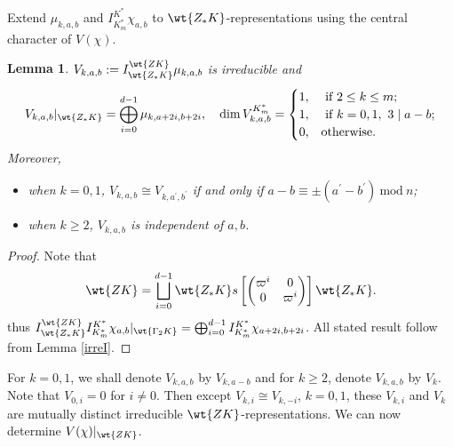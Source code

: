 \documentclass[11pt,reqno]{amsart}
\renewcommand{\mod}{\ \mathrm{mod}\ }\renewcommand{\Re}{{\mathrm{Re}}}
\theoremstyle{plain}
\newtheorem{lem}[thm]{Lemma}  \newtheorem{prop}[thm]{Proposition}
\theoremstyle{remark} \newtheorem{remark}[thm]{Remark}
\theoremstyle{definition} \newtheorem{exercise}[thm]{Exercise}
\theoremstyle{definition} \newtheorem{example}[thm]{Example} \newtheorem{condition}[thm]{Condition}
\numberwithin{equation}{section}
\renewcommand{\-}{\text{--}}
\begin{document}
  Extend $\mu_{k,a,b}$ and $I_{K_m^*}^{K^*}\chi_{a,b}$  to  $\wt{Z_*K}$-representations using  the central character of $V(\chi)$. 
\begin{lem}\label{irreIII}$V_{k,a,b}:=I_{\wt{Z_*K}}^{\wt{ZK}}\mu_{k,a,b}$ is irreducible and \[V_{k,a,b}|_{\wt{Z_*K}}=\bigoplus_{i=0}^{d-1}\mu_{k,a+2i,b+2i},\quad \dim V_{k,a,b}^{K_m^*}=\begin{cases} 1, &\ 
\text{if } 2\leq k\leq m;\\ 1, &\ \text{if } k=0,1,\ 3\mid a-b;\\
0,  & \text{otherwise}.\end{cases}\]
Moreover, 
\begin{itemize}
    \item when $k=0,1$, $V_{k,a,b}\cong V_{k,a^\prime,b^\prime}$ if and only if  $a-b\equiv \pm(a^\prime-b^\prime) \mod n$;
    \item when $k\geq2$, $V_{k,a,b}$ is independent of $a,b$.
\end{itemize}

\end{lem}

\begin{proof}Note that 
\[\wt{ZK}=\bigsqcup_{i=0}^{d-1} \wt{Z_*K}s\left[\begin{pmatrix}\varpi^i & 0\\ 0 & \varpi^i\end{pmatrix}\right]\wt{Z_*K}.\]
thus $I_{\wt{Z_*K}}^{\wt{ZK}}I_{K_m^*}^{K^*}\chi_{a,b}|_{\wt{\Gamma_2K}}=\bigoplus_{i=0}^{d-1}I_{K_m^*}^{K^*}\chi_{a+2i,b+2i}$.
All stated result follow from Lemma \ref{irreI}.
\end{proof}
For $k=0,1$, we shall   denote $V_{k,a,b}$ by $V_{k,a-b}$ and for $k\geq2$,   denote $V_{k,a,b}$ by $V_k$. Note that $V_{0,i}=0$ for $i\neq0$. Then except $V_{k,i}\cong V_{k,-i}$, $k=0,1$, these  $V_{k,i}$  and $V_k$ are mutually distinct irreducible $\wt{ZK}$-representations.  We can now determine $V(\chi)|_{\wt{ZK}}$.
\end{document}
